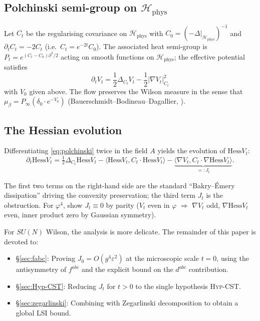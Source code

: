 \documentclass[11pt,a4paper]{amsart}
\theoremstyle{definition}
\newcommand{\abs}[1]{\left\lvert#1\right\rvert}
\newcommand{\Hess}{\mathrm{Hess}}
\begin{document}
\subsection{Polchinski semi-group on $\mathcal H_{\mathrm{phys}}$}

Let $C_t$ be the regularising covariance on $\mathcal H_{\mathrm{phys}}$
with $C_0 = (-\Delta|_{\mathcal H_{\mathrm{phys}}})^{-1}$ and $\partial_t C_t = -2 C_t$
(i.e.\ $C_t = e^{-2t} C_0$). The associated heat semi-group is
$P_t = e^{(C_t - C_0)\partial^2/2}$ acting on smooth functions on $\mathcal H_{\mathrm{phys}}$;
the effective potential satisfies
\begin{equation}\label{eq:polchinski}
\boxed{\quad \partial_t V_t = \frac{1}{2} \Delta_{C_t} V_t - \frac{1}{2} \abs{\nabla V_t}^2_{C_t} \quad}
\end{equation}
with $V_0$ given above. The flow preserves the Wilson measure in the
sense that $\mu_\beta = P_\infty (\delta_0 \cdot e^{-V_0})$ (Bauerschmidt--Bodineau--Dagallier,
\cite[\S 2.2]{BauerschmidtBodineauDagallier2024}).

\subsection{The Hessian evolution}\label{ssec:hess-evolution}

Differentiating \eqref{eq:polchinski} twice in the field $A$ yields
the evolution of $\Hess V_t$:
\begin{equation}\label{eq:hess-evolution}
\partial_t \Hess V_t = \tfrac{1}{2}\Delta_{C_t} \Hess V_t
- \langle \Hess V_t, C_t \cdot \Hess V_t\rangle
- \underbrace{\langle \nabla V_t, C_t \cdot \nabla \Hess V_t \rangle}_{=: J_t}.
\end{equation}

The first two terms on the right-hand side are the standard
``Bakry--\'Emery dissipation'' driving the convexity preservation;
the third term $J_t$ is the obstruction. For $\varphi^4$,
\cite[\S 4.1]{BauerschmidtDagallier2024} show $J_t \equiv 0$ by parity
($V_t$ even in $\varphi$ $\Rightarrow$ $\nabla V_t$ odd, $\nabla \Hess V_t$ even,
inner product zero by Gaussian symmetry).

For $SU(N)$ Wilson, the analysis is more delicate. The remainder of this
paper is devoted to:
\begin{itemize}[leftmargin=2em]
\item \S\ref{sec:fabc}: Proving $J_0 = O(g^4 \varepsilon^2)$ at the
microscopic scale $t=0$, using the
antisymmetry of $f^{abc}$ and the explicit bound on the $d^{abc}$ contribution.
\item \S\ref{sec:Hyp-CST}: Reducing $J_t$ for $t > 0$ to the
single hypothesis \textsc{Hyp-CST}.
\item \S\ref{sec:zegarlinski}: Combining with Zegarlinski decomposition
to obtain a global LSI bound.
\end{itemize}
\end{document}
